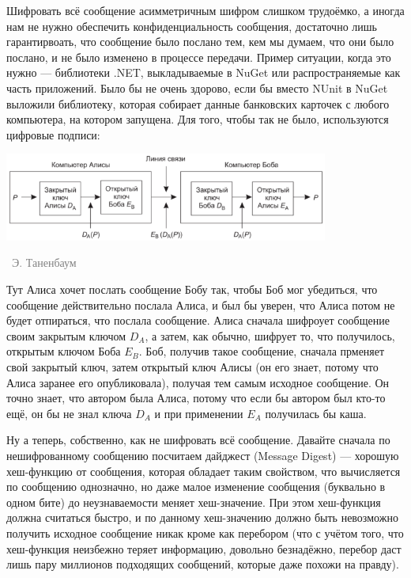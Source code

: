 \documentclass[a5paper]{article}
\newcommand{\attribution}[1] {
\vspace{-5mm}\begin{flushright}\begin{scriptsize}\textcolor{gray}{\textcopyright\, #1}\end{scriptsize}\end{flushright}
}
\begin{document}
Шифровать всё сообщение асимметричным шифром слишком трудоёмко, а иногда нам не нужно обеспечить конфиденциальность сообщения, достаточно лишь гарантирвоать, что сообщение было послано тем, кем мы думаем, что они было послано, и не было изменено в процессе передачи. Пример ситуации, когда это нужно --- библиотеки .NET, выкладываемые в NuGet или распространяемые как часть приложений. Было бы не очень здорово, если бы вместо NUnit в NuGet выложили библиотеку, которая собирает данные банковских карточек с любого компьютера, на котором запущена. Для того, чтобы так не было, используются цифровые подписи:

\begin{center}
    \includegraphics[width=0.8\textwidth]{signature.png}
    \attribution{Э. Таненбаум}
\end{center}

Тут Алиса хочет послать сообщение Бобу так, чтобы Боб мог убедиться, что сообщение действительно послала Алиса, и был бы уверен, что Алиса потом не будет отпираться, что послала сообщение. Алиса сначала шифроует сообщение своим закрытым ключом $D_A$, а затем, как обычно, шифрует то, что получилось, открытым ключом Боба $E_B$. Боб, получив такое сообщение, сначала прменяет свой закрытый ключ, затем открытый ключ Алисы (он его знает, потому что Алиса заранее его опубликовала), получая тем самым исходное сообщение. Он точно знает, что автором была Алиса, потому что если бы автором был кто-то ещё, он бы не знал ключа $D_A$ и при применении $E_A$ получилась бы каша. 

Ну а теперь, собственно, как не шифровать всё сообщение. Давайте сначала по нешифрованному сообщению посчитаем дайджест (Message Digest) --- хорошую хеш-функцию от сообщения, которая обладает таким свойством, что вычисляется по сообщению однозначно, но даже малое изменение сообщения (буквально в одном бите) до неузнаваемости меняет хеш-значение. При этом хеш-функция должна считаться быстро, и по данному хеш-значению должно быть невозможно получить исходное сообщение никак кроме как перебором (что с учётом того, что хеш-функция неизбежно теряет информацию, довольно безнадёжно, перебор даст лишь пару миллионов подходящих сообщений, которые даже похожи на правду). 
\end{document}
